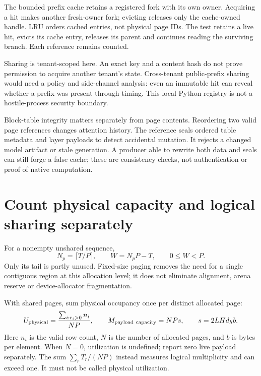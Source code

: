 The bounded prefix cache retains a registered fork with its own owner.
Acquiring a hit makes another fresh-owner fork; evicting releases only the
cache-owned handle. LRU orders cached entries, not physical page IDs.
The test retains a live hit, evicts its cache entry, releases its parent
and continues reading the surviving branch. Each reference remains counted.

Sharing is tenant-scoped here. An exact key and a content hash do not prove
permission to acquire another tenant's state. Cross-tenant public-prefix
sharing would need a policy and side-channel analysis: even an immutable
hit can reveal whether a prefix was present through timing. This local
Python registry is not a hostile-process security boundary.

Block-table integrity matters separately from page contents. Reordering
two valid page references changes attention history. The reference seals
ordered table metadata and layer payloads to detect accidental mutation.
It rejects a changed model artifact or stale generation. A producer able
to rewrite both data and seals can still forge a false cache; these are
consistency checks, not authentication or proof of native computation.

\section{Count physical capacity and logical sharing separately}
\label{evod36:memory}
For a nonempty unshared sequence,
\[
 N_p=\lceil T/P\rceil,\qquad W=N_pP-T,\qquad0\le W<P.
\]
Only its tail is partly unused. Fixed-size paging removes the need for a
single contiguous region at this allocation level; it does not eliminate
alignment, arena reserve or device-allocator fragmentation.

\begin{center}\end{center}

With shared pages, sum physical occupancy once per distinct allocated page:
\[
 U_{\rm physical}=\frac{\sum_{i:r_i>0} n_i}{NP},\qquad
 M_{\rm payload\ capacity}=NPs,\qquad s=2LHd_hb.
\]
Here $n_i$ is the valid row count, $N$ is the number of allocated pages,
and $b$ is bytes per element. When $N=0$, utilization is undefined; report
zero live payload separately. The sum $\sum_r T_r/(NP)$ instead measures
logical multiplicity and can exceed one. It must not be called physical
utilization.

